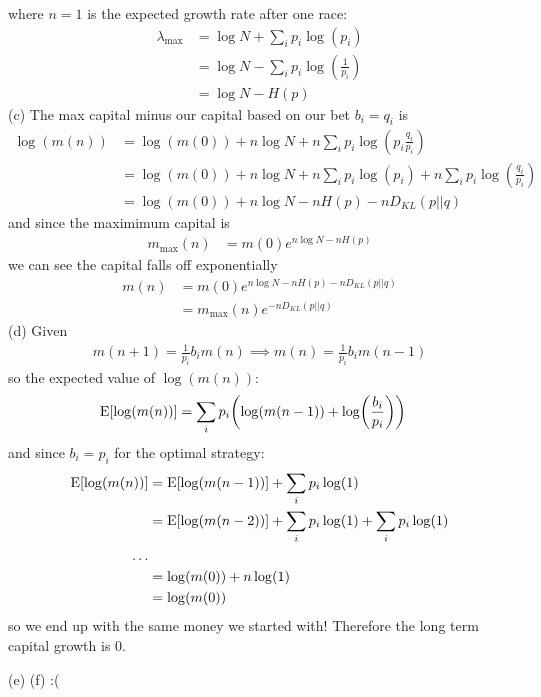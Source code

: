 \documentclass[../main.tex]{subfiles}
\begin{document}
where $n = 1$ is the expected growth rate after one race:
\begin{align*}
    \lambda_{\text{max}} &= \log N + \sum_i p_i \log(p_i) \\
    &= \log N - \sum_i p_i \log(\frac{1}{p_i}) \\
    &= \log N - H(p)
\end{align*}
(c) The max capital minus our capital based on our bet $b_i = q_i$ is
\begin{align*}
    \log(m(n)) &= \log(m(0)) + n \log N + n \sum_i p_i \log(p_i \frac{q_i}{p_i}) \\
    &= \log(m(0)) + n \log N + n \sum_i p_i \log(p_i) + n \sum_i p_i \log(\frac{q_i}{p_i}) \\
    &= \log(m(0)) + n \log N - n H(p) - n D_{KL}(p||q)
\end{align*}
and since the maximimum capital is
\begin{align*}
    m_{\text{max}}(n) &= m(0) e^{n \log N - n H(p)}
\end{align*}
we can see the capital falls off exponentially
\begin{align*}
    m(n) &= m(0) e^{n \log N - n H(p) - n D_{KL}(p||q)} \\
    &= m_{\text{max}}(n) e^{-n D_{KL}(p||q)}
\end{align*}
(d) Given
\begin{align*}
    m(n + 1) = \frac{1}{p_i} b_i m(n) \implies m(n) = \frac{1}{p_i} b_i m(n - 1)
\end{align*}
so the expected value of $\log(m(n))$:
\begin{align*}
    \E[\log(m(n))] &= \sum_i p_i \qt(\log(m(n - 1)) + \log(\frac{b_i}{p_i}))
\end{align*}
and since $b_i = p_i$ for the optimal strategy:
\begin{align*}
    \operatorname{E}[\log(m(n))] &= \operatorname{E}[\log(m(n - 1))] + \sum_i p_i \log(1) \\
    &= \operatorname{E}[\log(m(n - 2))] + \sum_i p_i \log(1) + \sum_i p_i \log(1) \\
    \dots \\
    &= \log(m(0)) + n \log(1) \\
    &= \log(m(0))
\end{align*}
so we end up with the same money we started with! Therefore the long term capital growth is 0.

(e) (f) :(
\end{document}
